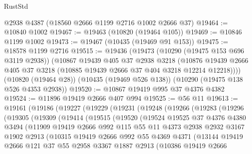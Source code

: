 \begin{lexlean}{RustStd}
\begin{coremodule}
    @2938
    @4387
    (@18560 @2666 @1199 @2716 @1002 @2666 @37)
@19464 := @10840 @1002
@19467 := @19463 (@10820 (@19464 @105))
@19469 := @10846 @1199 @1002
@19473 := @19467 (@10435 (@19469 @91 @153))
@19475 := @18578 @1199 @2716
@19515 := @19436
    (@19473
      (@10290 (@19475 @153 @696 @3119 @2938))
      (@10867
        @19439
        @405
        @37
        @2938
        @3218
        (@10876 @19439 @2666 @405 @37 @3218 (@10885 @19439 @2666 @37 @404 @3218 @12214 @12218))))
    (@10820 (@19464 @28))
    (@10435 (@19469 @526 @138))
    (@10290 (@19475 @138 @526 @4353 @2938))
@19520 := @10867 @19419 @995 @37 @4376 @4382
@19524 := @11896 @19419 @2666 @407 @994
@19525 := @56 @11
@19613 := @19161
    (@19186
      (@19227
        (@19229
          (@19231
            (@19248
              (@19266
                (@19283
                  (@19296
                    (@19305
                      (@19309
                        (@19414
                          (@19515
                            (@19520
                              (@19524
                                @19525
                                @37
                                @4376
                                @4380
                                @3494
                                (@11909
                                  @19419
                                  @2666
                                  @992
                                  @115
                                  @55
                                  @11
                                  @4373
                                  @2938
                                  @2932
                                  @3167
                                  @1902
                                  @2913
                                  (@10315
                                    @19419
                                    @2666
                                    @992
                                    @55
                                    @4369
                                    @4371
                                    (@13144
                                      @19419
                                      @2666
                                      @121
                                      @37
                                      @55
                                      @2958
                                      @3367
                                      @1887
                                      @2913
                                      (@10386
                                        @19419
                                        @2666

\end{coremodule}
\end{lexlean}
